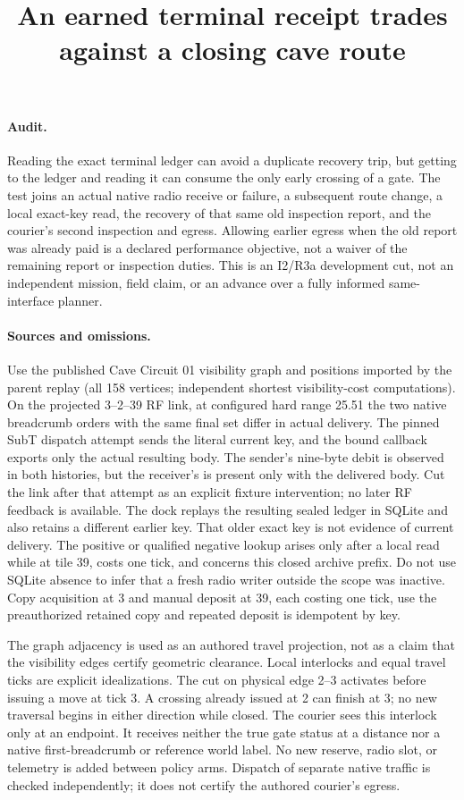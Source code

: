 \documentclass{article}
\title{An earned terminal receipt trades against a closing cave route}
\author{}
\date{}
\begin{document}
\maketitle
\paragraph{Audit.}
Reading the exact terminal ledger can avoid a duplicate recovery trip,
but getting to the ledger and reading it can consume the only early
crossing of a gate. The test joins an actual native radio receive or
failure, a subsequent route change, a local exact-key read, the
recovery of that same old inspection report, and the courier's
second inspection and egress. Allowing earlier egress when the old
report was already paid is a declared performance objective, not a
waiver of the remaining report or inspection duties. This is an I2/R3a
development cut, not an independent mission, field claim, or an
advance over a fully informed same-interface planner.

\paragraph{Sources and omissions.}
Use the published Cave Circuit 01 visibility graph and positions
imported by the parent replay (all 158 vertices; independent shortest
visibility-cost computations). On the projected 3--2--39 RF link,
at configured hard range 25.51 the two native breadcrumb orders with
the same final set differ in actual delivery. The pinned SubT dispatch
attempt sends the literal current key, and the bound callback exports
only the actual resulting body. The sender's nine-byte debit is
observed in both histories, but the receiver's is present only with
the delivered body. Cut the link after that attempt as an explicit
fixture intervention; no later RF feedback is available. The dock
replays the resulting sealed ledger in SQLite and also retains a
different earlier key. That older exact key is not evidence of current
delivery. The positive or qualified negative lookup arises only after
a local read while at tile 39, costs one tick, and concerns this
closed archive prefix. Do not use SQLite absence to infer that a fresh
radio writer outside the scope was inactive. Copy acquisition at 3
and manual deposit at 39, each costing one tick, use the preauthorized
retained copy and repeated deposit is idempotent by key.

The graph adjacency is used as an authored travel projection, not as
a claim that the visibility edges certify geometric clearance. Local
interlocks and equal travel ticks are explicit idealizations. The
cut on physical edge 2--3 activates before issuing a move at tick 3.
A crossing already issued at 2 can finish at 3; no new traversal
begins in either direction while closed. The courier sees this
interlock only at an endpoint. It receives neither the true gate status
at a distance nor a native first-breadcrumb or reference world label.
No new reserve, radio slot, or telemetry is added between policy arms.
Dispatch of separate native traffic is checked independently; it
does not certify the authored courier's egress.
\end{document}

